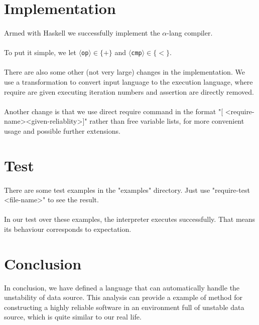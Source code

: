 \documentclass[a4paper]{article}
\begin{document}
\section{Implementation}
\paragraph{}
Armed with Haskell we successfully implement the $\alpha$-lang compiler.
\paragraph{}
To put it simple, we let $\langle$\texttt{op}$\rangle\in\{+\}$ and $\langle$\texttt{cmp}$\rangle\in\{<\}$.
\paragraph{}
There are also some other (not very large) changes in the implementation. We use a transformation to convert input language to the execution language, where require are given executing iteration numbers and assertion are directly removed.
\paragraph{}
Another change is that we use direct require command in the format "[ \textless require-name\textgreater  \textless given-reliablity\textgreater ]" rather than free variable lists, for more convenient usage and possible further extensions.
\section{Test}
\paragraph{}
There are some test examples in the "examples" directory. Just use "require-test \textless file-name\textgreater" to see the result.
\paragraph{}
In our test over these examples, the interpreter executes successfully. That means its behaviour corresponds to expectation.
\section{Conclusion}
In conclusion, we have defined a language that can automatically handle the unstability of data source. This analysis can provide a example of method for constructing a highly reliable software in an environment full of unstable data source, which is quite similar to our real life.
\end{document}
